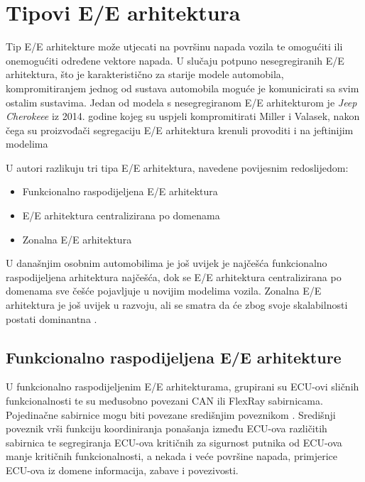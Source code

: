 \documentclass[times, utf8, diplomski, numeric]{fer}
\begin{document}
\section{Tipovi E/E arhitektura}
Tip E/E arhitekture može utjecati na površinu napada vozila te omogućiti ili onemogućiti određene vektore napada. U slučaju potpuno nesegregiranih E/E arhitektura, što je karakteristično za starije modele automobila, kompromitiranjem jednog od sustava automobila moguće je komunicirati sa svim ostalim sustavima. Jedan od modela s nesegregiranom E/E arhitekturom je \textit{Jeep Cherokeee} iz 2014. godine kojeg su uspjeli kompromitirati Miller i Valasek, nakon čega su proizvođači segregaciju E/E arhitektura krenuli provoditi i na jeftinijim modelima \cite{miller2015remote, dissecto2023networks}

U \cite{bosch2022handbook} autori razlikuju tri tipa E/E arhitektura, navedene povijesnim redoslijedom:
\begin{itemize}
    \item Funkcionalno raspodijeljena E/E arhitektura 
    \item E/E arhitektura centralizirana po domenama 
    \item Zonalna E/E arhitektura  
\end{itemize}

U današnjim osobnim automobilima je još uvijek je najčešća funkcionalno raspodijeljena arhitektura najčešća, dok se E/E arhitektura centralizirana po domenama sve češće pojavljuje u novijim modelima vozila. Zonalna E/E arhitektura je još uvijek u razvoju, ali se smatra da će zbog svoje skalabilnosti postati dominantna \cite{bosch2022handbook, nasser2023automotive, dissecto2023networks}.

\subsection{Funkcionalno raspodijeljena E/E arhitekture}
U funkcionalno raspodijeljenim E/E arhitekturama, grupirani su ECU-ovi sličnih funkcionalnosti te su međusobno povezani CAN ili FlexRay sabirnicama. Pojedinačne sabirnice mogu biti povezane središnjim poveznikom . Središnji poveznik vrši funkciju koordiniranja ponašanja između ECU-ova različitih sabirnica te segregiranja ECU-ova kritičnih za sigurnost putnika od ECU-ova manje kritičnih funkcionalnosti, a nekada i veće površine napada, primjerice ECU-ova iz domene informacija, zabave i povezivosti.
\end{document}
